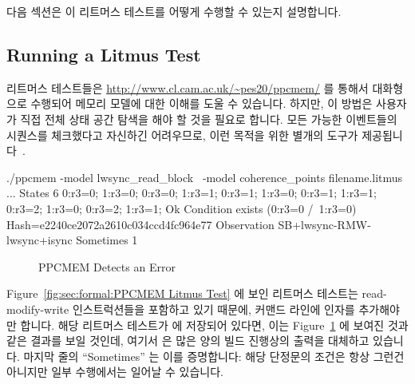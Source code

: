 다음 섹션은 이 리트머스 테스트를 어떻게 수행할 수 있는지 설명합니다.
\iffalse

Putting all this together, the C-language equivalent to the entire litmus
test is as shown in
Figure~\ref{fig:sec:formal:Meaning of PPCMEM Litmus Test}.
The key point is that if \co{atomic_add_return()} acts as a full
memory barrier (as the Linux kernel requires it to), 
then it should be impossible for \co{P0()}'s and \co{P1()}'s \co{r3}
variables to both be zero after execution completes.

The next section describes how to run this litmus test.
\fi

\subsection{Running a Litmus Test}
\label{sec:formal:Running a Litmus Test}

리트머스 테스트들은
\url{http://www.cl.cam.ac.uk/~pes20/ppcmem/} 를 통해서 대화형으로 수행되어
메모리 모델에 대한 이해를 도울 수 있습니다.
하지만, 이 방법은 사용자가 직접 전체 상태 공간 탐색을 해야 할 것을 필요로
합니다.
모든 가능한 이벤트들의 시퀀스를 체크했다고 자신하긴 어려우므로, 이런 목적을
위한 별개의 도구가 제공됩니다~\cite{PaulEMcKenney2011ppcmem}.
\iffalse

Litmus tests may be run interactively via
\url{http://www.cl.cam.ac.uk/~pes20/ppcmem/}, which can help build an
understanding of the memory model.
However, this approach requires that the user manually carry out the
full state-space search.
Because it is very difficult to be sure that you have checked every
possible sequence of events, a separate tool is provided for this
purpose~\cite{PaulEMcKenney2011ppcmem}.
\fi

{ \scriptsize
\begin{verbbox}
./ppcmem -model lwsync_read_block \
         -model coherence_points filename.litmus
...
States 6
0:r3=0; 1:r3=0;
0:r3=0; 1:r3=1;
0:r3=1; 1:r3=0;
0:r3=1; 1:r3=1;
0:r3=2; 1:r3=0;
0:r3=2; 1:r3=1;
Ok
Condition exists (0:r3=0 /\ 1:r3=0)
Hash=e2240ce2072a2610c034ccd4fc964e77
Observation SB+lwsync-RMW-lwsync+isync Sometimes 1
\end{verbbox}
}
\begin{figure}[tbp]
\centering
\theverbbox
\caption{PPCMEM Detects an Error}
\label{fig:sec:formal:PPCMEM Detects an Error}
\end{figure}

Figure~\ref{fig:sec:formal:PPCMEM Litmus Test}
에 보인 리트머스 테스트는 read-modify-write 인스트럭션들을 포함하고 있기
때문에, 커맨드 라인에  인자를 추가해야만 합니다.
해당 리트머스 테스트가  에 저장되어 있다면, 이는
Figure~\ref{fig:sec:formal:PPCMEM Detects an Error} 에 보여진 것과 같은 결과를
보일 것인데, 여기서 \co{...} 은 많은 양의 빌드 진행상의 출력을 대체하고
있습니다.
마지막 줄의 ``Sometimes'' 는 이를 증명합니다: 해당 단정문의 조건은 항상 그런건
아니지만 일부 수행에서는 일어날 수 있습니다.
\iffalse

